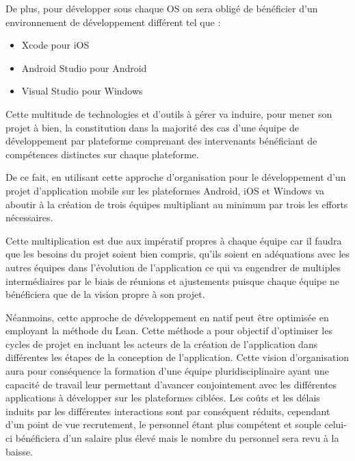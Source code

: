 \documentclass[11]{article}
\begin{document}
\vspace{0.5cm}

 
 
 
De plus, pour développer sous chaque OS on sera obligé de bénéficier d’un environnement de développement différent tel que :
\begin{itemize}
\item Xcode pour iOS
\item Android Studio pour Android
\item Visual Studio pour Windows
\end{itemize}
   
\vspace{0.5cm}

Cette multitude de technologies et d’outils à gérer va induire, pour mener son projet à bien, la constitution dans la majorité des cas d’une équipe de développement par plateforme comprenant des intervenants bénéficiant de compétences distinctes sur chaque plateforme.
    
\vspace{0.5cm}

De ce fait, en utilisant cette approche d’organisation pour le développement d’un projet d’application mobile sur les plateformes Android, iOS et Windows va aboutir à la création de trois équipes multipliant au minimum par trois les efforts nécessaires. 
    
 
\vspace{0.5cm}

Cette multiplication est due aux impératif propres à chaque équipe car il faudra que les besoins du projet soient bien compris, qu’ils soient en adéquations avec les autres équipes dans l’évolution de l’application ce qui va engendrer de multiples intermédiaires par le biais de réunions et ajustements puisque chaque équipe ne bénéficiera que de la vision propre à son projet.
    
\vspace{0.5cm}

Néanmoins, cette approche de développement en natif peut être optimisée en employant la méthode du Lean. Cette méthode a pour objectif d’optimiser les cycles de projet en incluant les acteurs de la création de l’application dans différentes les étapes de la conception de l’application. Cette vision d’organisation aura pour conséquence la formation d’une équipe pluridisciplinaire ayant une capacité de travail leur permettant d’avancer conjointement avec les différentes applications à développer sur les plateformes ciblées. Les coûts et les délais induits par les différentes interactions sont par conséquent réduits, cependant d’un point de vue recrutement, le personnel étant plus compétent et souple celui-ci bénéficiera d’un salaire plus élevé mais le nombre du personnel sera revu à la baisse.
    
\end{document}
